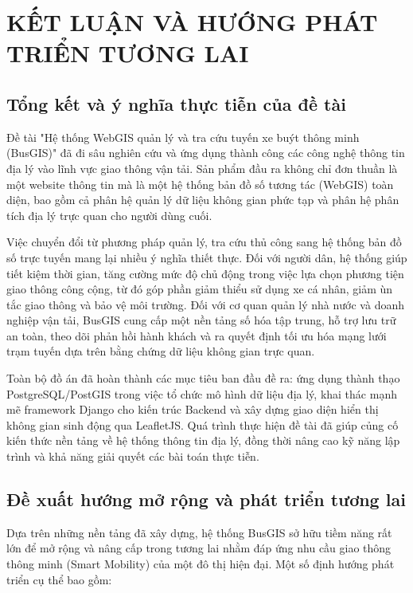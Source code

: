 \chapter{KẾT LUẬN VÀ HƯỚNG PHÁT TRIỂN TƯƠNG LAI}

\section{Tổng kết và ý nghĩa thực tiễn của đề tài}

Đề tài "Hệ thống WebGIS quản lý và tra cứu tuyến xe buýt thông minh (BusGIS)" đã đi sâu nghiên cứu và ứng dụng thành công các công nghệ thông tin địa lý vào lĩnh vực giao thông vận tải. Sản phẩm đầu ra không chỉ đơn thuần là một website thông tin mà là một hệ thống bản đồ số tương tác (WebGIS) toàn diện, bao gồm cả phân hệ quản lý dữ liệu không gian phức tạp và phân hệ phân tích địa lý trực quan cho người dùng cuối. 

Việc chuyển đổi từ phương pháp quản lý, tra cứu thủ công sang hệ thống bản đồ số trực tuyến mang lại nhiều ý nghĩa thiết thực. Đối với người dân, hệ thống giúp tiết kiệm thời gian, tăng cường mức độ chủ động trong việc lựa chọn phương tiện giao thông công cộng, từ đó góp phần giảm thiểu sử dụng xe cá nhân, giảm ùn tắc giao thông và bảo vệ môi trường. Đối với cơ quan quản lý nhà nước và doanh nghiệp vận tải, BusGIS cung cấp một nền tảng số hóa tập trung, hỗ trợ lưu trữ an toàn, theo dõi phản hồi hành khách và ra quyết định tối ưu hóa mạng lưới trạm tuyến dựa trên bằng chứng dữ liệu không gian trực quan.

Toàn bộ đồ án đã hoàn thành các mục tiêu ban đầu đề ra: ứng dụng thành thạo PostgreSQL/PostGIS trong việc tổ chức mô hình dữ liệu địa lý, khai thác mạnh mẽ framework Django cho kiến trúc Backend và xây dựng giao diện hiển thị không gian sinh động qua LeafletJS. Quá trình thực hiện đề tài đã giúp củng cố kiến thức nền tảng về hệ thống thông tin địa lý, đồng thời nâng cao kỹ năng lập trình và khả năng giải quyết các bài toán thực tiễn.

\section{Đề xuất hướng mở rộng và phát triển tương lai}

Dựa trên những nền tảng đã xây dựng, hệ thống BusGIS sở hữu tiềm năng rất lớn để mở rộng và nâng cấp trong tương lai nhằm đáp ứng nhu cầu giao thông thông minh (Smart Mobility) của một đô thị hiện đại. Một số định hướng phát triển cụ thể bao gồm:

